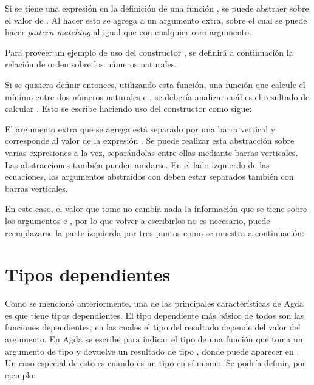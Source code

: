 Si se tiene una expresión  en la definición de una función , se puede abstraer  sobre el valor de . Al hacer esto se agrega a  un argumento extra, sobre el cual se puede hacer \textit{pattern matching} al igual que con cualquier otro argumento. 

Para proveer un ejemplo de uso del constructor , se definirá a continuación la relación de orden \AgdaFunction{\_<\_} sobre los números naturales.


Si se quisiera definir entonces, utilizando esta función, una función  que calcule el mínimo entre dos números naturales  e , se debería analizar cuál es el resultado de calcular  \AgdaFunction{<} . Esto se escribe haciendo uso del constructor  como sigue:


El argumento extra que se agrega está separado por una barra vertical y corresponde al valor de la expresión  \AgdaFunction{<} . Se puede realizar esta abstracción sobre varias expresiones a la vez, separándolas entre ellas mediante barras verticales. Las abstracciones  también pueden anidarse. En el lado izquierdo de las ecuaciones, los argumentos abstraídos con  deben estar separados también con barras verticales. 

En este caso, el valor que tome  \AgdaFunction{<}  no cambia nada la información que se tiene sobre los argumentos  e , por lo que volver a escribirlos no es necesario, puede reemplazarse la parte izquierda por tres puntos como se muestra a continuación:


\section{Tipos dependientes}\label{agda:dependent}

Como se mencionó anteriormente, una de las principales características de Agda es que tiene tipos dependientes. El tipo dependiente más básico de todos son las funciones dependientes, en las cuales el tipo del resultado depende del valor del argumento. En Agda se escribe \AgdaSymbol{(} \AgdaSymbol{:} \AgdaSymbol{)} \AgdaSymbol{$\rightarrow$}  para indicar el tipo de una función que toma un argumento  de tipo  y devuelve un resultado de tipo , donde  puede aparecer en . Un caso especial de esto es cuando  es un tipo en sí mismo. Se podría definir, por ejemplo:

